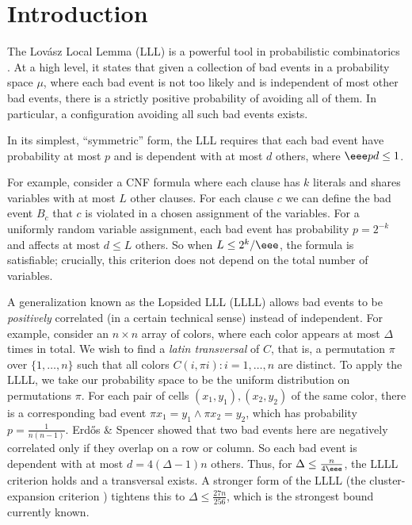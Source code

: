 \documentclass{toc}
\begin{document}
%
%
%



\section{Introduction}
The Lov\'{a}sz Local Lemma  (LLL) is a powerful tool in probabilistic combinatorics \cite{LLL}. At a high level, it states that given a collection of bad events in a probability space $\mu$, where each bad event is  not too likely and is independent of most other bad events, there is a strictly positive probability of avoiding all of them. In particular, a configuration avoiding all such bad events exists. 

In its simplest, ``symmetric'' form, the LLL requires that each 
bad event %
%
%
%
%
have  %
probability at most $p$ and is dependent with at most $d$ others,
where $\eee p d \leq 1$.  

For example, consider a CNF formula where each clause has $k$ literals and shares variables with at most $L$ other clauses. For each clause $c$ we can define the bad event $B_c$ that $c$ is violated in a chosen assignment of the variables. For a uniformly random variable assignment, each bad event has probability $p = 2^{-k}$ and affects at most $d \leq L$ others. So when
%
%
$L \leq 2^k/\eee$,   %
the formula is satisfiable; crucially, this criterion does not depend on the total number of variables.

A generalization known as the Lopsided LLL (LLLL) allows bad events to be \emph{positively} correlated (in a certain technical sense) instead of independent. For example, consider an $n \times n$ array of colors, where each color appears at most $\Delta$ times in total. We wish to find a \emph{latin transversal} of $C$, that is, a permutation $\pi$ over $\{1, \dots, n \}$ such that all colors $C(i, \pi i): i = 1, \dots, n$ are distinct. To apply the LLLL, we take our probability space to be the uniform distribution on permutations $\pi$. For each pair of cells $(x_1, y_1), (x_2, y_2)$ of the same color, there is a corresponding bad event $\pi x_1 = y_1 \wedge \pi x_2 = y_2$, which has probability
$p = \frac{1}{n(n-1)}$.
%
%
%
Erd\H{o}s \& Spencer \cite{LopsTrav} showed that two bad events here are
negatively correlated 
only if they overlap on a row or column. So each bad event is dependent with at most $d = 4 (\Delta-1) n$ others.
Thus, for $\Delta \leq \frac{n}{4 \eee}$, the LLLL criterion holds and a transversal exists. A stronger form of the LLLL (the cluster-expansion criterion \cite{bissacot}) tightens this to $\Delta \leq \frac{27n}{256}$, which is the strongest bound currently known.
\end{document}

